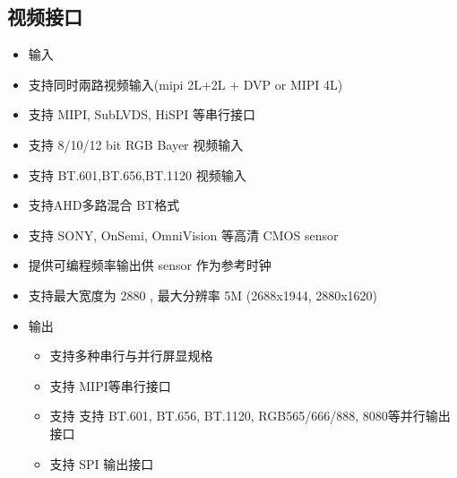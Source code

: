 \documentclass[letterpaper,10pt,english]{sphinxmanual}
\begin{document}
\subsection{视频接口}
\label{\detokenize{contents/system-overview/features:id4}}\begin{itemize}
\item {} 
\sphinxAtStartPar
输入

\item {} 
\sphinxAtStartPar
支持同时兩路视频输入(mipi 2L+2L + DVP or MIPI 4L)

\item {} 
\sphinxAtStartPar
支持 MIPI, Sub\sphinxhyphen{}LVDS, HiSPI 等串行接口

\item {} 
\sphinxAtStartPar
支持 8/10/12 bit RGB Bayer 视频输入

\item {} 
\sphinxAtStartPar
支持 BT.601,BT.656,BT.1120     视频输入

\item {} 
\sphinxAtStartPar
支持AHD多路混合 BT格式

\item {} 
\sphinxAtStartPar
支持 SONY, OnSemi, OmniVision 等高清 CMOS sensor

\item {} 
\sphinxAtStartPar
提供可编程频率输出供 sensor 作为参考时钟

\item {} 
\sphinxAtStartPar
支持最大宽度为 2880 , 最大分辨率 5M (2688x1944, 2880x1620)

\item {} 
\sphinxAtStartPar
输出
\begin{itemize}
\item {} 
\sphinxAtStartPar
支持多种串行与并行屏显规格

\item {} 
\sphinxAtStartPar
支持 MIPI等串行接口

\item {} 
\sphinxAtStartPar
支持 支持 BT.601, BT.656, BT.1120, RGB565/666/888, 8080等并行输出接口

\item {} 
\sphinxAtStartPar
支持 SPI 输出接口

\end{itemize}

\end{itemize}
\end{document}
